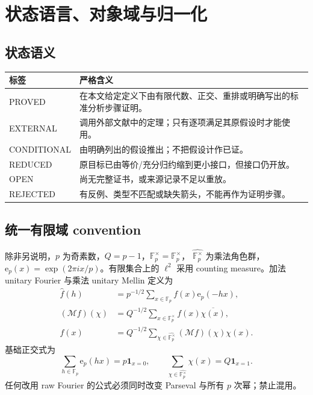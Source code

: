 \documentclass[11pt,a4paper]{ctexart}
\theoremstyle{definition}
\newcommand{\e}{\mathrm e}
\newcommand{\1}{\mathbf 1}
\newcommand{\F}{\mathbb F}
\newcommand{\G}{\F_p^\times}
\newcommand{\Gh}{\widehat{\G}}
\newcommand{\PROVED}{\textcolor{green!40!black}{\textsf{PROVED}}}
\newcommand{\EXTERNAL}{\textcolor{blue!65!black}{\textsf{EXTERNAL}}}
\newcommand{\CONDITIONAL}{\textcolor{orange!75!black}{\textsf{CONDITIONAL}}}
\newcommand{\REDUCED}{\textcolor{orange!85!black}{\textsf{REDUCED}}}
\newcommand{\OPEN}{\textcolor{red!70!black}{\textsf{OPEN}}}
\newcommand{\REJECTED}{\textcolor{purple!70!black}{\textsf{REJECTED}}}
\begin{document}
\section{状态语言、对象域与归一化}

\subsection{状态语义}

\begin{center}
\begin{tabular}{p{}p{}}
\toprule
标签&严格含义\\ \midrule
\PROVED&在本文给定定义下由有限代数、正交、重排或明确写出的标准分析步骤证明。\\
\EXTERNAL&调用外部文献中的定理；只有逐项满足其原假设时才能使用。\\
\CONDITIONAL&由明确列出的假设推出；不把假设计作已证。\\
\REDUCED&原目标已由等价/充分归约缩到更小接口，但接口仍开放。\\
\OPEN&尚无完整证书，或来源记录不足以重放。\\
\REJECTED&有反例、类型不匹配或缺失箭头，不能再作为证明步骤。\\
\bottomrule
\end{tabular}
\end{center}

\subsection{统一有限域 convention}

除非另说明，$p$ 为奇素数，$Q=p-1$，$\G=\F_p^\times$，
$\Gh$ 为乘法角色群，$\e_p(x)=\exp(2\pi i x/p)$。有限集合上的 $\ell^2$
采用 counting measure。加法 unitary Fourier 与乘法 unitary Mellin 定义为
\begin{align}
 \widehat f(h)&=p^{-1/2}\sum_{x\in\F_p}f(x)\e_p(-hx),
                                                        \tag{N.1}\\
 (\mathcal Mf)(\chi)&=Q^{-1/2}\sum_{x\in\G}f(x)\overline{\chi(x)},
                                                        \tag{N.2}\\
 f(x)&=Q^{-1/2}\sum_{\chi\in\Gh}(\mathcal Mf)(\chi)\chi(x).\tag{N.3}
\end{align}
基础正交式为
\[
 \sum_{h\in\F_p}\e_p(hx)=p\1_{x=0},\qquad
 \sum_{\chi\in\Gh}\chi(x)=Q\1_{x=1}.
 \tag{N.4}
\]
任何改用 raw Fourier 的公式必须同时改变 Parseval 与所有 $p$ 次幂；禁止混用。
\end{document}
